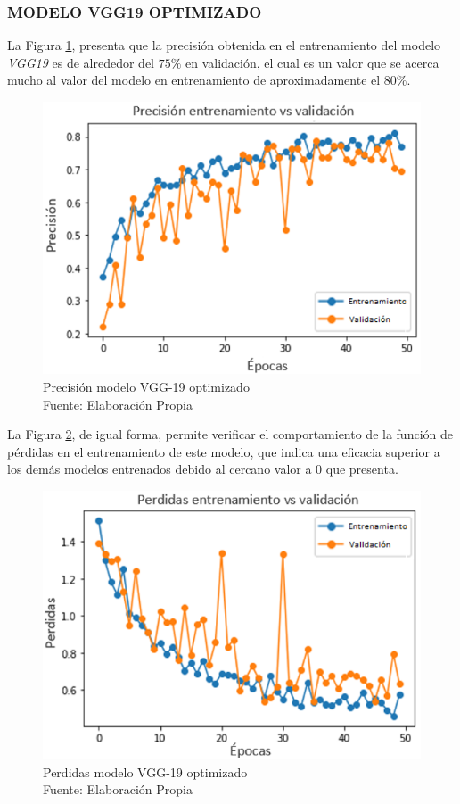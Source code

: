 \subsubsection{\MakeUppercase{Modelo  VGG19 optimizado}}

La Figura \ref{fig:preci_vgg19_OPT}, presenta que la precisión obtenida en el entrenamiento del modelo \textit{VGG19} es de alrededor del $75 \%$ en validación, el cual es un valor que se acerca mucho al valor del modelo en entrenamiento de aproximadamente el $80 \%$.

\begin{figure}[ht]
	\centering
	\includegraphics[scale=0.7]{Figs/504.png}
	\caption{Precisión modelo VGG-19 optimizado\\ Fuente: Elaboración Propia}
	\label{fig:preci_vgg19_OPT}
\end{figure}

\newpage
La Figura \ref{fig:perdda_vgg19_opt}, de igual forma, permite verificar el comportamiento de la función de pérdidas en el entrenamiento de este modelo, que indica una eficacia superior a los demás modelos entrenados debido al cercano valor a $0$ que presenta. 

\begin{figure}[ht]
	\centering
	\includegraphics[scale=0.7]{Figs/505.png}
	\caption{Perdidas modelo VGG-19 optimizado \\ Fuente: Elaboración Propia}
	\label{fig:perdda_vgg19_opt}
\end{figure}

